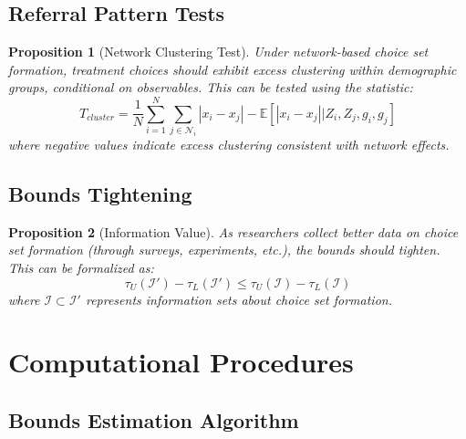 \documentclass{article}
\newtheorem{proposition}{Proposition}
\newcommand{\E}{\mathbb{E}}
\begin{document}
\subsection{Referral Pattern Tests}

\begin{proposition}[Network Clustering Test]
Under network-based choice set formation, treatment choices should exhibit excess clustering within demographic groups, conditional on observables. %
This can be tested using the statistic:
\begin{equation}
T_{cluster} = \frac{1}{N} \sum_{i=1}^N \sum_{j \in \mathcal{N}_i} |x_i - x_j| - \E[|x_i - x_j| | Z_i, Z_j, g_i, g_j] %
\end{equation}
where negative values indicate excess clustering consistent with network effects.
\end{proposition}

\subsection{Bounds Tightening}

\begin{proposition}[Information Value]
As researchers collect better data on choice set formation (through surveys, experiments, etc.), the bounds should tighten. This can be formalized as:
\begin{equation}
\tau_U(\mathcal{I}') - \tau_L(\mathcal{I}') \leq \tau_U(\mathcal{I}) - \tau_L(\mathcal{I}) %
\end{equation}
where $\mathcal{I} \subset \mathcal{I}'$ represents information sets about choice set formation.
\end{proposition}

\section{Computational Procedures}

\subsection{Bounds Estimation Algorithm}
\end{document}
